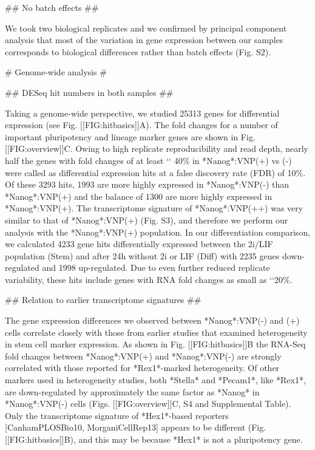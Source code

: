 \documentclass[aps,prl,twocolumn,superscriptaddress]{revtex4}
\begin{document}
## No batch effects ##

We took two biological replicates and we confirmed by principal component analysis that most of the variation in gene expression between our samples corresponds to biological differences rather than batch effects (Fig. S2).


 


# Genome-wide analysis #




## DESeq hit numbers in both samples ##

Taking a genome-wide perspective, we studied 25313 genes for differential expression (see Fig. [[FIG:hitbasics]]A). The fold changes for a number of important pluripotency and lineage marker genes are shown in Fig. [[FIG:overview]]C. 
Owing to high replicate reproducibility and read depth, nearly half the genes with fold changes of at least  `\pm` 40\% in *Nanog*:VNP(+) vs (-) were called as differential expression hits at a false discovery rate (FDR) of 10\%. Of these 3293 hits, 1993 are more highly expressed in *Nanog*:VNP(-) than *Nanog*:VNP(+) and the balance of 1300 are more highly expressed in *Nanog*:VNP(+). The transcriptome signature of *Nanog*:VNP(++) was very similar to that of *Nanog*:VNP(+) (Fig. S3), and therefore we perform our analysis with the *Nanog*:VNP(+) population.  In our differentiation comparison, we calculated 4233 gene hits differentially expressed between the 2i/LIF population (Stem) and after 24h without 2i or LIF (Diff) with 2235 genes down-regulated and 1998 up-regulated. Due to even further reduced replicate variability, these hits include genes with RNA fold changes as small as `\pm`20\%. 


## Relation to earlier transcriptome signatures ##

The gene expression differences we observed between *Nanog*:VNP(-) and (+) cells correlate closely with those from earlier studies that examined heterogeneity in stem cell marker expression. As shown in Fig. [[FIG:hitbasics]]B the RNA-Seq fold changes between *Nanog*:VNP(+) and *Nanog*:VNP(-) are strongly correlated with those reported for *Rex1*-marked heterogeneity. Of other markers used in heterogeneity studies, both *Stella* and *Pecam1*, like *Rex1*, are down-regulated by approximately the same factor as *Nanog* in *Nanog*:VNP(-) cells (Figs. [[FIG:overview]]C,  S4 and Supplemental Table). Only the transcriptome signature of *Hex1*-based reporters [CanhamPLOSBio10, MorganiCellRep13] appears to be different (Fig. [[FIG:hitbasics]]B), and this may be because *Hex1* is not a pluripotency gene.
\end{document}
